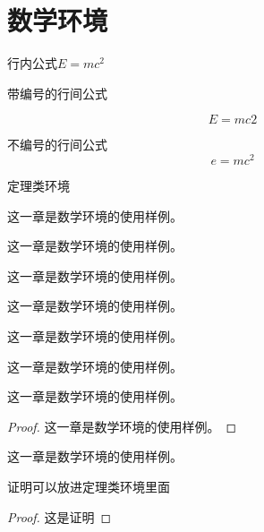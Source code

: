 \section{数学环境}



行内公式$E=mc^2$


带编号的行间公式

\begin{equation}
E=mc2
\end{equation}

不编号的行间公式
\[
e=mc^{2}
\]

定理类环境

\begin{definition}
这一章是数学环境的使用样例。
\end{definition}

\begin{theorem}
这一章是数学环境的使用样例。
\end{theorem}


\begin{lemma}
这一章是数学环境的使用样例。
\end{lemma}


\begin{proposition}
这一章是数学环境的使用样例。

\end{proposition}



\begin{corollary}
这一章是数学环境的使用样例。
\end{corollary}


\begin{example}
这一章是数学环境的使用样例。
\end{example}




\begin{remark}
这一章是数学环境的使用样例。
\end{remark}





\begin{proof}
这一章是数学环境的使用样例。
\end{proof}


\begin{solution}
这一章是数学环境的使用样例。
\end{solution}



\begin{theorem}

  证明可以放进定理类环境里面
\begin{proof}
这是证明
\end{proof}
\end{theorem}

